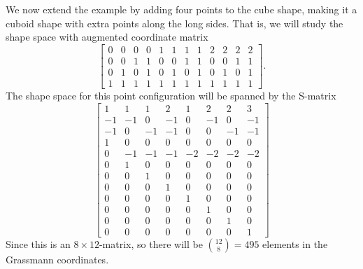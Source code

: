 \documentclass[a4paper,12pt]{book}
\theoremstyle{plain}
\theoremstyle{definition}
\begin{document}
We now extend the example by adding four points to the cube shape, making it a cuboid shape
with extra points along the long sides. That is, we will study the shape space with
augmented coordinate matrix
\setcounter{MaxMatrixCols}{20}
\[
\begin{bmatrix}
	0 & 0 & 0 & 0 & 1 & 1 & 1 & 1 & 2 & 2 & 2 & 2 \\
	0 & 0 & 1 & 1 & 0 & 0 & 1 & 1 & 0 & 0 & 1 & 1 \\
	0 & 1 & 0 & 1 & 0 & 1 & 0 & 1 & 0 & 1 & 0 & 1 \\
	1 & 1 & 1 & 1 & 1 & 1 & 1 & 1 & 1 & 1 & 1 & 1
\end{bmatrix}.
\]
The shape space for this point configuration will be spanned by the S-matrix
\[
	\begin{bmatrix}
	 1 &  1 &  1 &  2 &  1 &  2 &  2 &  3 \\
 	 -1 & -1 &  0 & -1 &  0 & -1 &  0 & -1 \\
 	 -1 &  0 & -1 & -1 &  0 &  0 & -1 & -1 \\
 	 1 &  0 &  0 &  0 &  0 &  0 &  0 &  0 \\
 	 0 & -1 & -1 & -1 & -2 & -2 & -2 & -2 \\
 	 0 &  1 &  0 &  0 &  0 &  0 &  0 &  0 \\
 	 0 &  0 &  1 &  0 &  0 &  0 &  0 &  0 \\
 	 0 &  0 &  0 &  1 &  0 &  0 &  0 &  0 \\
 	 0 &  0 &  0 &  0 &  1 &  0 &  0 &  0 \\
 	 0 &  0 &  0 &  0 &  0 &  1 &  0 &  0 \\
 	 0 &  0 &  0 &  0 &  0 &  0 &  1 &  0 \\
 	 0 &  0 &  0 &  0 &  0 &  0 &  0 &  1
	\end{bmatrix}
\]
Since this is an \( 8 \times 12 \)-matrix, so there will be
\( {12 \choose 8} = 495 \) elements in the Grassmann coordinates.

\begin{figure}
\begin{center}
\end{center}
\end{figure}
\end{document}
